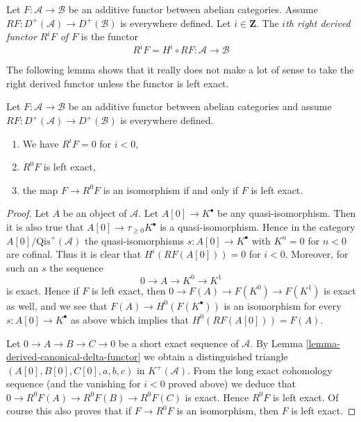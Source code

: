 \begin{definition}
\label{definition-higher-derived-functors}
Let $F : \mathcal{A} \to \mathcal{B}$ be an additive functor
between abelian categories. Assume
$RF : D^{+}(\mathcal{A}) \to D^{+}(\mathcal{B})$ is everywhere
defined. Let $i \in \mathbf{Z}$.
The {\it $i$th right derived functor $R^iF$ of $F$} is the functor
$$
R^iF = H^i \circ RF :
\mathcal{A}
\longrightarrow
\mathcal{B}
$$
\end{definition}

\noindent
The following lemma shows that it really does not make a lot
of sense to take the right derived functor unless the functor
is left exact.

\begin{lemma}
\label{lemma-left-exact-higher-derived}
Let $F : \mathcal{A} \to \mathcal{B}$ be an additive functor
between abelian categories and assume
$RF : D^{+}(\mathcal{A}) \to D^{+}(\mathcal{B})$ is everywhere
defined.
\begin{enumerate}
\item We have $R^iF = 0$ for $i < 0$,
\item $R^0F$ is left exact,
\item the map $F \to R^0F$ is an isomorphism if and
only if $F$ is left exact.
\end{enumerate}
\end{lemma}

\begin{proof}
Let $A$ be an object of $\mathcal{A}$. Let $A[0] \to K^\bullet$
be any quasi-isomorphism. Then it is also true that
$A[0] \to \tau_{\geq 0}K^\bullet$ is a quasi-isomorphism.
Hence in the category $A[0]/\text{Qis}^{+}(\mathcal{A})$ the
quasi-isomorphisms $s : A[0] \to K^\bullet$ with $K^n = 0$ for $n < 0$
are cofinal. Thus it is clear that $H^i(RF(A[0])) = 0$ for $i < 0$.
Moreover, for such an $s$ the sequence
$$
0 \to A \to K^0 \to K^1
$$
is exact. Hence if $F$ is left exact, then $0 \to F(A) \to F(K^0) \to F(K^1)$
is exact as well, and we see that $F(A) \to H^0(F(K^\bullet))$ is an
isomorphism for every $s : A[0] \to K^\bullet$ as above which implies
that $H^0(RF(A[0])) = F(A)$.

\medskip\noindent
Let $0 \to A \to B \to C \to 0$ be a short exact sequence of $\mathcal{A}$.
By
Lemma \ref{lemma-derived-canonical-delta-functor}
we obtain a distinguished triangle
$(A[0], B[0], C[0], a, b, c)$ in $K^{+}(\mathcal{A})$.
From the long exact cohomology sequence (and the vanishing for $i < 0$
proved above) we deduce that $0 \to R^0F(A) \to R^0F(B) \to R^0F(C)$
is exact. Hence $R^0F$ is left exact. Of course this also proves that if
$F \to R^0F$ is an isomorphism, then $F$ is left exact.
\end{proof}


